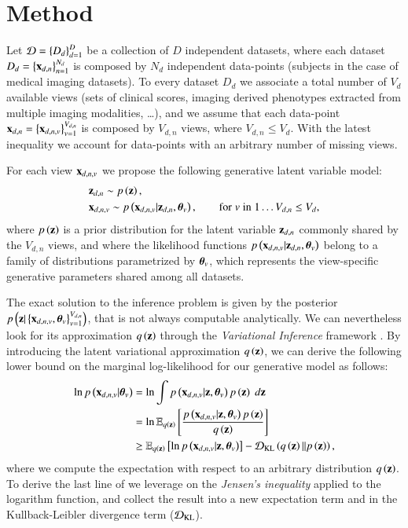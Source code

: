 \section{Method}




Let $\mathcal{D} = \left\{D_d\right\}_{d=1}^D$ be a collection of $D$ independent datasets, where each dataset $D_d = \left\{\mathbf{x}_{d,n}\right\}_{n=1}^{N_d}$ is composed by $N_d$ independent data-points (\eg subjects in the case of medical imaging datasets).
To every dataset $D_d$ we associate a total number of $V_d$ available views
(\eg sets of clinical scores, imaging derived phenotypes extracted from multiple imaging modalities, \ldots),
and we assume that each data-point $\mathbf{x}_{d,n} = \left\{\mathbf{x}_{d,n,v}\right\}_{v=1}^{V_{d,n}}$ is composed by $V_{d,n}$ views,
where $V_{d,n} \leq V_d$.
With the latest inequality we account for data-points with an arbitrary number of missing views.

For each view $\mathbf{x}_{d,n,v}$ we propose the following generative latent variable model:
\begin{equation}\label{eq:model}
\begin{aligned}
&\z_{d,n} \sim \p{\z}, \\  %
&\xdnv \sim \p{\xdnv|\z_{d,n},\thetab_v},  %
\qquad \textnormal {for} \; v \; \textnormal{in} \; 1 \ldots V_{d,n} \leq V_d,
\end{aligned}
\end{equation}
where $p\left(\mathbf{z}\right)$ is a prior distribution for the latent variable $\mathbf{z}_{d,n}$ commonly shared by the $V_{d,n}$ views, and
where the likelihood functions $p\left(\mathbf{x}_{d,n,v}|\mathbf{z}_{d,n},\boldsymbol{\theta}_v\right)$ belong to a family of distributions parametrized by $\boldsymbol{\theta}_v$, which represents the view-specific generative parameters shared among all datasets.

The exact solution to the inference problem is given by the posterior $p\left(\mathbf{z}|\left\{\mathbf{x}_{d,n,v},\boldsymbol{\theta}_v\right\}_{v=1}^{V_{d,n}}\right)$, that is not always computable analytically.
We can nevertheless look for its approximation $q\left(\mathbf{z}\right)$ through the \textit{Variational Inference} framework \citep{Blei2017}.
By introducing the latent variational approximation $q\left(\mathbf{z}\right)$, we can derive the following lower bound on the marginal log-likelihood for our generative model as follows:
\begin{equation}\label{eq:LB}
\begin{aligned}
\ln p\left(\mathbf{x}_{d,n,v}|\boldsymbol{\theta}_v\right) &= \ln \int p\left(\mathbf{x}_{d,n,v}|\mathbf{z}, \boldsymbol{\theta}_v\right) p\left(\mathbf{z}\right) \; d\mathbf{z} \\
                        &= \ln \operatorname{\mathbb{E}}_{q\left(\mathbf{z}\right)}\left[\frac{p\left(\mathbf{x}_{d,n,v}|\mathbf{z}, \boldsymbol{\theta}_v\right) p\left(\mathbf{z}\right)}{q\left(\mathbf{z}\right)}\right] \\
                        &\geq \operatorname{\mathbb{E}}_{q\left(\mathbf{z}\right)}\left[\ln p\left(\mathbf{x}_{d,n,v}|\mathbf{z}, \boldsymbol{\theta}_v\right)\right] - \operatorname{\mathcal{D}_{KL}}\left(q\left(\mathbf{z}\right)||p\left(\mathbf{z}\right)\right),
\end{aligned}
\end{equation}
where we compute the expectation with respect to an arbitrary distribution $q\left(\mathbf{z}\right)$.
To derive the last line of  we leverage on the \textit{Jensen's inequality} applied to the logarithm function, and collect the result into a new expectation term and in the Kullback-Leibler divergence term ($\operatorname{\mathcal{D}_{KL}}$).

